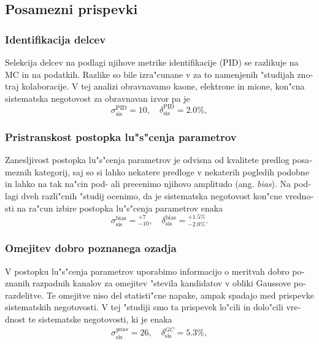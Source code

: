 \begin{otherlanguage}{slovene}
\subsection{Posamezni prispevki}

\subsubsection{Identifikacija delcev}
Selekcija delcev na podlagi njihove metrike identifikacije (PID) se razlikuje na MC in na podatkih. Razlike so bile izra"cunane v za to namenjenih "studijah znotraj kolaboracije. V tej analizi obravnavamo kaone, elektrone in mione, kon"cna sistematska negotovost za obravnavan izvor pa je
\begin{equation}
\sigma_{\mathrm{sis}}^{\mathrm{PID}} = 10,\quad \delta_{\mathrm{sis}}^{\mathrm{PID}} = 2.0\%,
\end{equation}

\subsubsection{Pristranskost postopka lu"s"cenja parametrov}
Zanesljivost postopka lu"s"cenja parametrov je odvisna od kvalitete predlog posameznih kategorij, saj so si lahko nekatere predloge v nekaterih pogledih podobne in lahko na tak na"cin pod- ali precenimo njihovo amplitudo (ang. \textit{bias}). Na podlagi dveh razli"cnih "studij ocenimo, da je sistematska negotovost kon"cne vrednosti na ra"cun izbire postopka lu"s"cenja parametrov enaka
\begin{equation}
\sigma_{\mathrm{sis}}^{\mathrm{bias}} = {}^{+7}_{-10},\quad \delta_{\mathrm{sis}}^{\mathrm{bias}} = {}^{+1.5\%}_{-2.0\%}.
\end{equation}

\subsubsection{Omejitev dobro poznanega ozadja}
V postopku lu"s"cenja parametrov uporabimo informacijo o meritvah dobro poznanih razpadnih kanalov za omejitev "stevila kandidatov v obliki Gaussove porazdelitve. Te omejitve niso del statisti"cne napake, ampak spadajo med prispevke sistematskih negotovosti. V tej "studiji smo ta prispevek lo"cili in dolo"cili vrednost te sistematske negotovosti, ki je enaka
\begin{align}
\sigma_{\mathrm{sis}}^{gaus} = 26,\quad \delta_{\mathrm{sis}}^{GC} = 5.3\%,
\end{align}


\end{otherlanguage}
